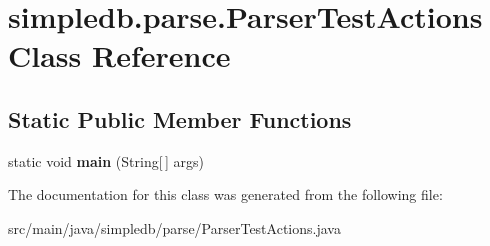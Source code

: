 \hypertarget{classsimpledb_1_1parse_1_1ParserTestActions}{}\section{simpledb.\+parse.\+Parser\+Test\+Actions Class Reference}
\label{classsimpledb_1_1parse_1_1ParserTestActions}
\subsection*{Static Public Member Functions}
\begin{DoxyCompactItemize}
\item 
\mbox{\label{classsimpledb_1_1parse_1_1ParserTestActions_a7b64d2475f8963cfbe1bceda3033759f}} 
static void {\bfseries main} (String\mbox{[}$\,$\mbox{]} args)
\end{DoxyCompactItemize}


The documentation for this class was generated from the following file\+:\begin{DoxyCompactItemize}
\item 
src/main/java/simpledb/parse/Parser\+Test\+Actions.\+java\end{DoxyCompactItemize}
